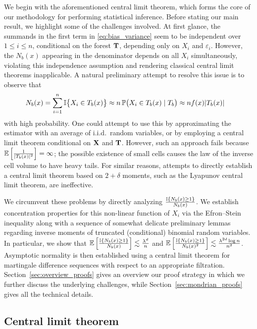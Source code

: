 We begin with the aforementioned central limit theorem,
which forms the core of our methodology for performing statistical inference.
Before stating our main result,
we highlight some of the challenges involved.
At first glance, the summands in the first term in \eqref{eq:bias_variance}
seem to be independent over $1 \leq i \leq n$, conditional
on the forest $\mathbf{T}$, depending only on $X_i$ and $\varepsilon_i$.
However, the $N_b(x)$ appearing in the denominator depends on all $X_i$
simultaneously, violating this independence assumption
and rendering classical central limit theorems inapplicable.
A natural preliminary attempt to resolve this issue is to observe that
%
\begin{align*}
  N_b(x)&=
  \sum_{i=1}^{n} \mathbb{I}\big\{X_i \in T_b(x)\big\}
  \approx
  n \, \mathbb{P} \big( X_i \in T_b(x) \mid T_b \big)
  \approx
  n f(x) |T_b(x)|
\end{align*}
%
with high probability.
One could attempt to use this by
approximating the estimator with an average of
i.i.d.\ random variables, or by
employing a central limit theorem
conditional on $\mathbf{X}$ and $\mathbf{T}$.
However, such an approach fails because
$\mathbb{E} \left[ \frac{1}{|T_b(x)|^2} \right] = \infty$;
the possible existence of small cells causes the law of the
inverse cell volume to have heavy tails.
For similar reasons, attempts to directly establish a central limit theorem
based on $2 + \delta$ moments, such as the Lyapunov central limit theorem,
are ineffective.

We circumvent these problems by directly analyzing
$\frac{\mathbb{I}\{N_b(x) \geq 1\}}{N_b(x)}$.
We establish concentration properties
for this non-linear function of $X_i$ via the Efron--Stein inequality
\citep[Section 3.1]{boucheron2016concentration}
along with a sequence of somewhat delicate preliminary lemmas regarding
inverse moments of truncated (conditional) binomial random variables.
In particular, we show that
$\mathbb{E} \left[ \frac{\mathbb{I} \{N_b(x) \geq 1\}}{N_b(x)} \right]
\lesssim \frac{\lambda^d}{n}$
and
$\mathbb{E} \left[ \frac{\mathbb{I} \{N_b(x) \geq 1\}}{N_b(x)^2} \right]
\lesssim \frac{\lambda^{2d} \log n}{n^2}$.
Asymptotic normality is then established
using a central limit theorem for martingale difference sequences
\citep[Theorem~3.2]{hall2014martingale}
with respect to an appropriate filtration.
Section~\ref{sec:overview_proofs} gives an overview our proof strategy in
which  we further discuss the underlying challenges,
while Section~\ref{sec:mondrian_proofs} gives all the technical details.

\subsection{Central limit theorem}
\label{sec:mondrian_clt}

